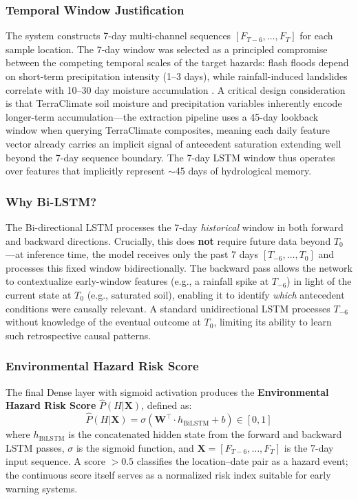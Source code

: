\documentclass[journal,twoside]{IEEEtran}
\begin{document}
\subsubsection{Temporal Window Justification}
The system constructs 7-day multi-channel sequences $[F_{T-6}, \dots, F_T]$ for each sample location. The 7-day window was selected as a principled compromise between the competing temporal scales of the target hazards: flash floods depend on short-term precipitation intensity (1--3 days), while rainfall-induced landslides correlate with 10--30 day moisture accumulation \cite{petley2007landslides}. A critical design consideration is that TerraClimate soil moisture and precipitation variables inherently encode longer-term accumulation---the extraction pipeline uses a 45-day lookback window when querying TerraClimate composites, meaning each daily feature vector already carries an implicit signal of antecedent saturation extending well beyond the 7-day sequence boundary. The 7-day LSTM window thus operates over features that implicitly represent $\sim$45 days of hydrological memory.

\subsubsection{Why Bi-LSTM?}
The Bi-directional LSTM processes the 7-day \textit{historical} window in both forward and backward directions. Crucially, this does \textbf{not} require future data beyond $T_0$---at inference time, the model receives only the past 7 days $[T_{-6}, \dots, T_0]$ and processes this fixed window bidirectionally. The backward pass allows the network to contextualize early-window features (e.g., a rainfall spike at $T_{-6}$) in light of the current state at $T_0$ (e.g., saturated soil), enabling it to identify \textit{which} antecedent conditions were causally relevant. A standard unidirectional LSTM processes $T_{-6}$ without knowledge of the eventual outcome at $T_0$, limiting its ability to learn such retrospective causal patterns.

\subsubsection{Environmental Hazard Risk Score}
The final Dense layer with sigmoid activation produces the \textbf{Environmental Hazard Risk Score} $\hat{P}(H | \mathbf{X})$, defined as:
\begin{equation}
    \hat{P}(H | \mathbf{X}) = \sigma\left(\mathbf{W}^\top \cdot h_{\text{BiLSTM}} + b\right) \in [0, 1]
\end{equation}
where $h_{\text{BiLSTM}}$ is the concatenated hidden state from the forward and backward LSTM passes, $\sigma$ is the sigmoid function, and $\mathbf{X} = [F_{T-6}, \dots, F_T]$ is the 7-day input sequence. A score $> 0.5$ classifies the location--date pair as a hazard event; the continuous score itself serves as a normalized risk index suitable for early warning systems.
\end{document}
